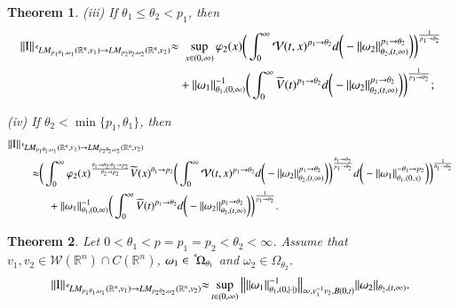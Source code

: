\documentclass[11pt]{amsart}
\theoremstyle{plain}
\newtheorem{thm}{Theorem}[section]
\theoremstyle{definition}
\numberwithin{thm}{section}
\numberwithin{equation}{section}
\begin{document}
\begin{thm}
	{\rm (iii)} If ${\theta}_1 \leq {\theta}_2 < p_1$, then
	\begin{align*}
	\|{\operatorname{I}}\|_{{\,^{^{\bf c}}\!} LM_{p_1{\theta}_1,{\omega}_1}({{\mathbb R}^n},v_1) {\rightarrow} LM_{p_2{\theta}_2,{\omega}_2}({{\mathbb R}^n},v_2)} {\approx} & \,\, \sup_{x\in (0,\infty)} {\varphi}_2(x) \bigg(\int_0^{\infty} {\mathcal V}(t,x)^{p_1 {\rightarrow} {\theta}_2} d\bigg(-\|{\omega}_2\|_{{\theta}_2,(t,\infty)}^{p_1 {\rightarrow} {\theta}_2}\bigg)\bigg)^{\frac{1}{p_1 {\rightarrow} {\theta}_2}}\\
	&  + \|{\omega}_1\|_{{\theta}_1,(0,\infty)}^{-1} \bigg( \int_0^{\infty} \widetilde{V}(t)^{p_1 {\rightarrow} {\theta}_2} d\bigg(-\|{\omega}_2\|_{{\theta}_2,(t,\infty)}^{p_1 {\rightarrow} {\theta}_2}\bigg)\bigg)^{\frac{1}{p_1 {\rightarrow} {\theta}_2}};
	\end{align*}
	
	{\rm (iv)} If ${\theta}_2 < \min\{p_1,{\theta}_1\}$, then
	\begin{align*}
	\|{\operatorname{I}}\|_{{\,^{^{\bf c}}\!} LM_{p_1{\theta}_1,{\omega}_1}({{\mathbb R}^n},v_1){\rightarrow} LM_{p_2{\theta}_2,{\omega}_2}({{\mathbb R}^n},v_2)} & \\
	& \hspace{-3.5cm} {\approx} \bigg( \int_0^{\infty} {\varphi}_2(x)^{\frac{{\theta}_1 {\rightarrow} {\theta}_2 \cdot {\theta}_1 {\rightarrow} p_2}{{\theta}_2 {\rightarrow} p_2}} \widetilde{V}(x)^{{\theta}_1 {\rightarrow} p_2} \bigg(\int_0^{\infty}{\mathcal V}(t,x)^{p_1 {\rightarrow}{\theta}_2} d\bigg(-\|{\omega}_2\|_{{\theta}_2,(t,\infty)}^{p_1 {\rightarrow} {\theta}_2} \bigg)\bigg)^{\frac{{\theta}_1 {\rightarrow} {\theta}_2}{p_1 {\rightarrow} {\theta}_2}} d\bigg(-\|{\omega}_1\|_{{\theta}_1,(0,x)}^{-{\theta}_1 {\rightarrow} p_2} \bigg)\bigg)^{\frac{1}{{\theta}_1 {\rightarrow} {\theta}_2}} \\
	& \hspace{-3cm} +\|{\omega}_1\|_{{\theta}_1,(0,\infty)}^{-1} \bigg( \int_0^{\infty} \widetilde{V}(t)^{p_1 {\rightarrow} {\theta}_2} d\bigg(-\|{\omega}_2\|_{{\theta}_2,(t,\infty)}^{p_1 {\rightarrow} {\theta}_2} \bigg)\bigg)^{\frac{1}{p_1 {\rightarrow} {\theta}_2}}.
	\end{align*}
\end{thm}

\begin{thm}\label{maintheorem2}
	Let $0 < {\theta}_1 < p = p_1 = p_2 < {\theta}_2 < \infty$. Assume that $v_1, v_2 \in {{\mathcal W}}({{\mathbb R}^n})\cap C({{\mathbb R}^n})$, ${\omega}_1 \in {\,^{^{\bf c}}\!}{{\Omega}_{{\theta}_1}}$ and ${\omega}_2\in {\Omega}_{{\theta}_2}$.
	\begin{equation*}
	\|{\operatorname{I}}\|_{{\,^{^{\bf c}}\!} LM_{p_1{\theta}_1,{\omega}_1}({{\mathbb R}^n},v_1){\rightarrow} LM_{p_2{\theta}_2,{\omega}_2}({{\mathbb R}^n},v_2)}{\approx} 
	\sup_{t\in {(0,{\infty})}} \big\|\|{\omega}_1\|_{{\theta}_1,(0,|\cdot|)}^{-1} \big\|_{\infty,v_1^{-1}v_2,B(0,t)} \|{\omega}_2\|_{{\theta}_2,(t,\infty)}.
	\end{equation*}
\end{thm}
\end{document}
